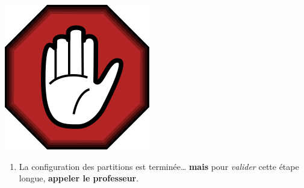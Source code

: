 \documentclass[11pt]{article}
\providecommand{\tightlist}{%
      \setlength{\itemsep}{0pt}\setlength{\parskip}{0pt}}
\begin{document}
\includegraphics{res/stop_hand.png}

\begin{enumerate}
\def\labelenumi{\arabic{enumi}.}
\setcounter{enumi}{24}
\tightlist
\item
  La configuration des partitions est terminée\ldots{} \textbf{mais}
  pour \emph{valider} cette étape longue, \textbf{appeler le
  professeur}.
\end{enumerate}
\end{document}

